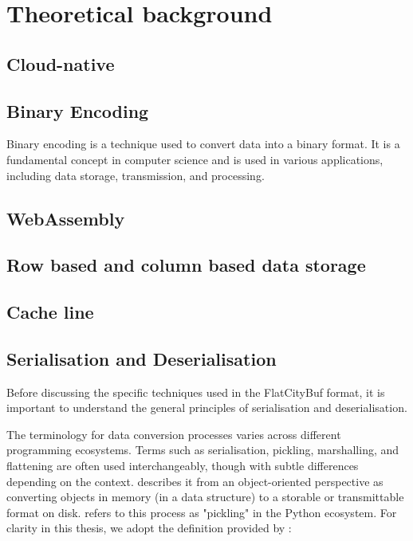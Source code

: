 \chapter{Theoretical background}
\label{chap:theoretical_background}

\section{Cloud-native}
\label{tb:cloud_native}

\section{Binary Encoding}
\label{tb:binary_encoding}
Binary encoding is a technique used to convert data into a binary format. It is a fundamental concept in computer science and is used in various applications, including data storage, transmission, and processing.


\section{WebAssembly}
\label{tb:webassembly}

\section{Row based and column based data storage}
\label{tb:row_based_column_based_data_storage}

\section{Cache line}
\label{tb:cache_line}

\section{Serialisation and Deserialisation}
\label{tb:serialisation_deserialisation}
Before discussing the specific techniques used in the FlatCityBuf format, it is important to understand the general principles of serialisation and deserialisation.

The terminology for data conversion processes varies across different programming ecosystems. Terms such as serialisation, pickling, marshalling, and flattening are often used interchangeably, though with subtle differences depending on the context. \citet{cpp_serialization} describes it from an object-oriented perspective as converting objects in memory (in a data structure) to a storable or transmittable format on disk. \citet{py_serialization} refers to this process as "pickling" in the Python ecosystem. For clarity in this thesis, we adopt the definition provided by \citet{viotti_2022}:

